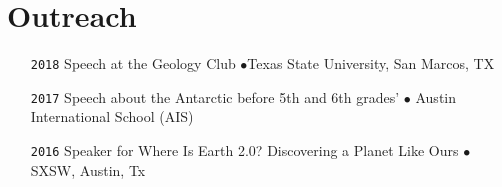 \section*{Outreach}

\begin{itemize}[leftmargin=3.8em, labelsep=1.5em]
    \setlength\itemsep{-.5em}
    \item[\texttt{2018}] Speech at the Geology Club $\bullet$Texas State University, San Marcos, TX
    \item[\texttt{2017}] Speech about the Antarctic before 5th and 6th grades' $\bullet$ Austin International School (AIS)
    \item[\texttt{2016}] Speaker for Where Is Earth 2.0? Discovering a Planet Like Ours $\bullet$ SXSW, Austin, Tx
\end{itemize}